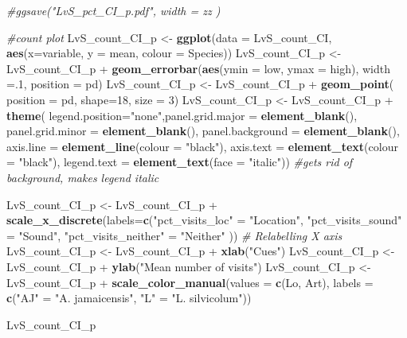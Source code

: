\documentclass[]{article}
\newenvironment{Shaded}{\begin{snugshade}}{\end{snugshade}}
\newcommand{\KeywordTok}[1]{\textcolor[rgb]{0.13,0.29,0.53}{\textbf{{#1}}}}
\newcommand{\DataTypeTok}[1]{\textcolor[rgb]{0.13,0.29,0.53}{{#1}}}
\newcommand{\DecValTok}[1]{\textcolor[rgb]{0.00,0.00,0.81}{{#1}}}
\newcommand{\StringTok}[1]{\textcolor[rgb]{0.31,0.60,0.02}{{#1}}}
\newcommand{\CommentTok}[1]{\textcolor[rgb]{0.56,0.35,0.01}{\textit{{#1}}}}
\newcommand{\NormalTok}[1]{{#1}}
\begin{document}
\begin{Shaded}
\begin{Highlighting}[]
\CommentTok{#ggsave("LvS_pct_CI_p.pdf", width = zz  )}

\CommentTok{#count plot}
\NormalTok{LvS_count_CI_p <-}\StringTok{ }\KeywordTok{ggplot}\NormalTok{(}\DataTypeTok{data =} \NormalTok{LvS_count_CI, }\KeywordTok{aes}\NormalTok{(}\DataTypeTok{x=}\NormalTok{variable, }\DataTypeTok{y =} \NormalTok{mean, }\DataTypeTok{colour =} \NormalTok{Species))}
\NormalTok{LvS_count_CI_p <-}\StringTok{ }\NormalTok{LvS_count_CI_p +}\StringTok{ }\KeywordTok{geom_errorbar}\NormalTok{(}\KeywordTok{aes}\NormalTok{(}\DataTypeTok{ymin =} \NormalTok{low, }\DataTypeTok{ymax =} \NormalTok{high), }\DataTypeTok{width =}\NormalTok{.}\DecValTok{1}\NormalTok{, }\DataTypeTok{position =} \NormalTok{pd)}
\NormalTok{LvS_count_CI_p <-}\StringTok{ }\NormalTok{LvS_count_CI_p +}\StringTok{ }\KeywordTok{geom_point}\NormalTok{( }\DataTypeTok{position =} \NormalTok{pd, }\DataTypeTok{shape=}\DecValTok{18}\NormalTok{, }\DataTypeTok{size =} \DecValTok{3}\NormalTok{)}
\NormalTok{LvS_count_CI_p <-}\StringTok{ }\NormalTok{LvS_count_CI_p +}\StringTok{  }\KeywordTok{theme}\NormalTok{( }\DataTypeTok{legend.position=}\StringTok{"none"}\NormalTok{,}\DataTypeTok{panel.grid.major =} \KeywordTok{element_blank}\NormalTok{(), }\DataTypeTok{panel.grid.minor =} \KeywordTok{element_blank}\NormalTok{(),}
\DataTypeTok{panel.background =} \KeywordTok{element_blank}\NormalTok{(), }\DataTypeTok{axis.line =} \KeywordTok{element_line}\NormalTok{(}\DataTypeTok{colour =} \StringTok{"black"}\NormalTok{), }\DataTypeTok{axis.text =} \KeywordTok{element_text}\NormalTok{(}\DataTypeTok{colour =} \StringTok{"black"}\NormalTok{), }\DataTypeTok{legend.text =} \KeywordTok{element_text}\NormalTok{(}\DataTypeTok{face =} \StringTok{"italic"}\NormalTok{))  }\CommentTok{#gets rid of background, makes legend italic}

\NormalTok{LvS_count_CI_p <-}\StringTok{ }\NormalTok{LvS_count_CI_p +}\StringTok{ }\KeywordTok{scale_x_discrete}\NormalTok{(}\DataTypeTok{labels=}\KeywordTok{c}\NormalTok{(}\StringTok{"pct_visits_loc"} \NormalTok{=}\StringTok{ "Location"}\NormalTok{, }\StringTok{"pct_visits_sound"} \NormalTok{=}\StringTok{ "Sound"}\NormalTok{,}
                              \StringTok{"pct_visits_neither"} \NormalTok{=}\StringTok{ "Neither"} \NormalTok{))  }\CommentTok{# Relabelling X axis}
\NormalTok{LvS_count_CI_p <-}\StringTok{ }\NormalTok{LvS_count_CI_p +}\StringTok{ }\KeywordTok{xlab}\NormalTok{(}\StringTok{"Cues"}\NormalTok{)}
\NormalTok{LvS_count_CI_p <-}\StringTok{ }\NormalTok{LvS_count_CI_p +}\StringTok{ }\KeywordTok{ylab}\NormalTok{(}\StringTok{"Mean number of visits"}\NormalTok{)}
\NormalTok{LvS_count_CI_p <-}\StringTok{ }\NormalTok{LvS_count_CI_p +}\StringTok{ }\KeywordTok{scale_color_manual}\NormalTok{(}\DataTypeTok{values =} \KeywordTok{c}\NormalTok{(Lo, Art), }\DataTypeTok{labels =} \KeywordTok{c}\NormalTok{(}\StringTok{"AJ"} \NormalTok{=}\StringTok{ "A. jamaicensis"}\NormalTok{, }\StringTok{"L"} \NormalTok{=}\StringTok{ "L. silvicolum"}\NormalTok{))}

\NormalTok{LvS_count_CI_p }
\end{Highlighting}
\end{Shaded}
\end{document}
